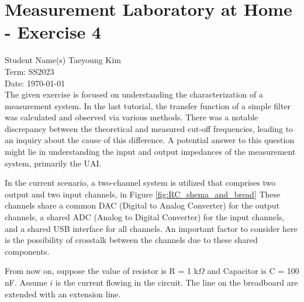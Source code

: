 \documentclass[
	a4paper,
	11pt,
]{article}
\begin{document}
\fancyhf{} %

\section*{Measurement Laboratory at Home - Exercise 4}
Student Name(s)\: Taeyoung Kim\\
Term: SS2023 \\
Date: \today \\

The given exercise is focused on understanding the characterization of a measurement system. In the last tutorial, the transfer function of a simple filter was calculated and observed via various methods. There was a notable discrepancy between the theoretical and measured cut-off frequencies, leading to an inquiry about the cause of this difference. A potential answer to this question might lie in understanding the input and output impedances of the measurement system, primarily the UAI.

In the current scenario, a two-channel system is utilized that comprises two output and two input channels, in Figure \ref{fig:RC_shema_and_bread} These channels share a common DAC (Digital to Analog Converter) for the output channels, a shared ADC (Analog to Digital Converter) for the input channels, and a shared USB interface for all channels. An important factor to consider here is the possibility of crosstalk between the channels due to these shared components.

From now on, suppose the value of resistor is R = 1 k\(\Omega\) and Capacitor is C = 100 \si{\nano\farad}. Assume \(i\) is the current flowing in the circuit. The line on the breadboard are extended with an extension line.
\end{document}
